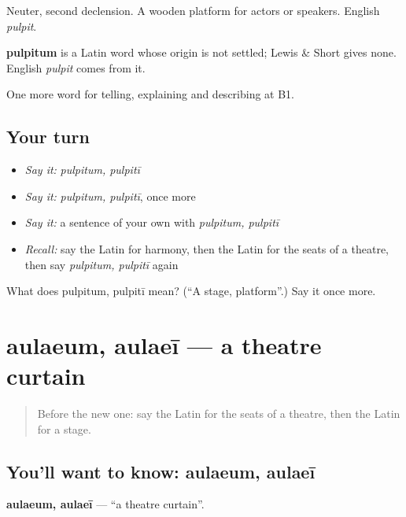 Neuter, second declension. A wooden platform for actors or speakers. English \emph{pulpit}.

\begin{cousinweb}
\textbf{pulpitum} is a Latin word whose origin is not settled; Lewis \& Short gives none. English \emph{pulpit} comes from it.
\end{cousinweb}

\begin{grammarlens}[title={What you've built}]
One more word for telling, explaining and describing at B1.
\end{grammarlens}

\subsection*{Your turn}
\begin{itemize}
\raggedright
  \item \emph{Say it:} \emph{pulpitum, pulpitī}
  \item \emph{Say it:} \emph{pulpitum, pulpitī}, once more
  \item \emph{Say it:} a sentence of your own with \emph{pulpitum, pulpitī}
  \item \emph{Recall:} say the Latin for harmony, then the Latin for the seats of a theatre, then say \emph{pulpitum, pulpitī} again
\end{itemize}

\begin{tcolorbox}[breakable,colback=teal!4,colframe=teal!35!black,title={Before you move on}]
What does pulpitum, pulpitī mean? (\textquotedblleft{}A stage, platform\textquotedblright{}.) Say it once more.
\end{tcolorbox}
\section[aulaeum, aulaeī]{aulaeum, aulaeī — a theatre curtain}

\label{lesson:LA-C546-aulaeum}



\begin{quote}
Before the new one: say the Latin for the seats of a theatre, then the Latin for a stage.
\end{quote}

\subsection*{You'll want to know: aulaeum, aulaeī}
\textbf{aulaeum, aulaeī} — \textquotedblleft{}a theatre curtain\textquotedblright{}.

